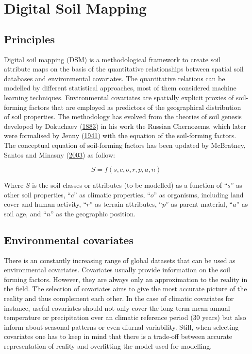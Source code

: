 \documentclass[
  10pt,
  b5paper,
  oneside]{book}
\begin{document}
\hypertarget{digital-soil-mapping}{%
\chapter{Digital Soil Mapping}\label{digital-soil-mapping}}

\hypertarget{principles}{%
\section{Principles}\label{principles}}

Digital soil mapping (DSM) is a methodological framework to create soil attribute maps on the basis of the quantitative relationships between spatial soil databases and environmental covariates. The quantitative relations can be modelled by different statistical approaches, most of them considered machine learning techniques. Environmental covariates are spatially explicit proxies of soil-forming factors that are employed as predictors of the geographical distribution of soil properties. The methodology has evolved from the theories of soil genesis developed by Dokuchaev (\protect\hyperlink{ref-Dokuchaev1883}{1883}) in his work the Russian Chernozems, which later were formalised by Jenny (\protect\hyperlink{ref-Jenny1941}{1941}) with the equation of the soil-forming factors. The conceptual equation of soil-forming factors has been updated by McBratney, Santos and Minasny (\protect\hyperlink{ref-McBratney2003}{2003}) as follow:

\begin{equation} 
  S = f\left(s,c,o,r,p,a,n\right)
  \label{eq:scorpan}
\end{equation}

Where \(S\) is the soil classes or attributes (to be modelled) as a function of ``\(s\)'' as other soil properties, ``\(c\)'' as climatic properties, ``\(o\)'' as organisms, including land cover and human activity, ``\(r\)'' as terrain attributes, ``\(p\)'' as parent material, ``\(a\)'' as soil age, and ``\(n\)'' as the geographic position.

\hypertarget{environmental-covariates}{%
\section{Environmental covariates}\label{environmental-covariates}}

There is an constantly increasing range of global datasets that can be used as environmental covariates. Covariates usually provide information on the soil forming factors. However, they are always only an approximation to the reality in the field. The selection of covariates aims to give the most accurate picture of the reality and thus complement each other. In the case of climatic covariates for instance, useful covariates should not only cover the long-term mean annual temperature or precipitation over an climatic reference period (30 years) but also inform about seasonal patterns or even diurnal variability. Still, when selecting covariates one has to keep in mind that there is a trade-off between accurate representation of reality and overfitting the model used for modelling.
\end{document}
